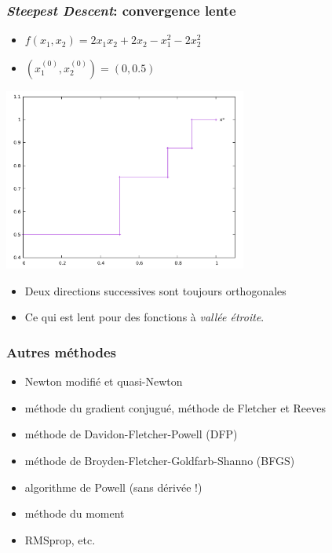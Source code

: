 \documentclass{beamer}
\begin{document}
\begin{frame}
  \frametitle{\emph{Steepest Descent}: convergence lente}

  \begin{itemize}
  \item $f(x_1,x_2) = 2x_1x_2 + 2x_2 - x_1^2 - 2x_2^2$
  \item$(x_1^{(0)}, x_2^{(0)}) = (0, 0.5)$ 
  \end{itemize}

  \begin{center}
      \includegraphics[width=0.6\textwidth]{steepest-desc}    
  \end{center}
  
  \begin{itemize}
  \item Deux directions successives sont toujours orthogonales
  \item Ce qui est lent pour des fonctions à \emph{vallée étroite}. 
  \end{itemize}
    
  
\end{frame}

\begin{frame}
  \frametitle{Autres méthodes}

  \begin{itemize}
  \item Newton modifié et quasi-Newton
  \item méthode du gradient conjugué, méthode de Fletcher et Reeves
  \item méthode de Davidon-Fletcher-Powell (DFP)
  \item méthode de Broyden-Fletcher-Goldfarb-Shanno (BFGS)
  \item algorithme de Powell (sans dérivée !)
  \item méthode du moment
  \item RMSprop, etc.
  \end{itemize}
  
\end{frame}
\end{document}
